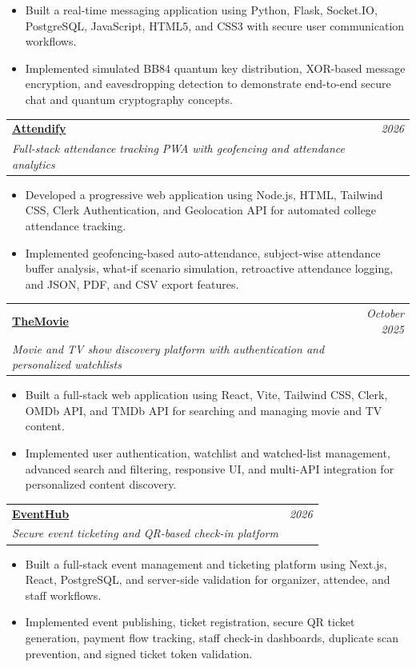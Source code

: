 \documentclass[a4paper,10pt]{article}
\makeatletter
\newcommand{\resumeProject}[4]{
\vspace{0.25mm}\item
    \begin{tabular*}{0.98\textwidth}[t]{l@{\extracolsep{\fill}}r}
        \textbf{#1} & \textit{\small{#3}} \\
        \small{\textit{#2}} & \small{#4}
    \end{tabular*}
    \vspace{-1.35mm}
}
\newcommand{\resumeItemListStart}{\begin{justify}\begin{itemize}[leftmargin=2.3ex, rightmargin=0.5ex, labelsep=0.9mm,itemsep=0.25mm,topsep=0.3mm,parsep=0mm]\small}
\newcommand{\resumeItemListEnd}{\end{itemize}\end{justify}\vspace{-1.15mm}}
\makeatother
\begin{document}
  \resumeItemListStart
    \item {Built a real-time messaging application using Python, Flask, Socket.IO, PostgreSQL, JavaScript, HTML5, and CSS3 with secure user communication workflows.}
    \item {Implemented simulated BB84 quantum key distribution, XOR-based message encryption, and eavesdropping detection to demonstrate end-to-end secure chat and quantum cryptography concepts.}
  \resumeItemListEnd

  \resumeProject
    {\href{https://attendify.justshivamm.in}{Attendify}}
    {Full-stack attendance tracking PWA with geofencing and attendance analytics}
    {2026}
    {}

  \resumeItemListStart
    \item {Developed a progressive web application using Node.js, HTML, Tailwind CSS, Clerk Authentication, and Geolocation API for automated college attendance tracking.}
    \item {Implemented geofencing-based auto-attendance, subject-wise attendance buffer analysis, what-if scenario simulation, retroactive attendance logging, and JSON, PDF, and CSV export features.}
  \resumeItemListEnd

  \resumeProject
    {\href{https://themovie.justshivamm.in/}{TheMovie}}
    {Movie and TV show discovery platform with authentication and personalized watchlists}
    {October 2025}
    {}

  \resumeItemListStart
    \item {Built a full-stack web application using React, Vite, Tailwind CSS, Clerk, OMDb API, and TMDb API for searching and managing movie and TV content.}
    \item {Implemented user authentication, watchlist and watched-list management, advanced search and filtering, responsive UI, and multi-API integration for personalized content discovery.}
  \resumeItemListEnd

  \resumeProject
    {\href{https://eventhub.justshivamm.in}{EventHub}}
    {Secure event ticketing and QR-based check-in platform}
    {2026}
    {}

  \resumeItemListStart
    \item {Built a full-stack event management and ticketing platform using Next.js, React, PostgreSQL, and server-side validation for organizer, attendee, and staff workflows.}
    \item {Implemented event publishing, ticket registration, secure QR ticket generation, payment flow tracking, staff check-in dashboards, duplicate scan prevention, and signed ticket token validation.}
  \resumeItemListEnd
\end{document}
